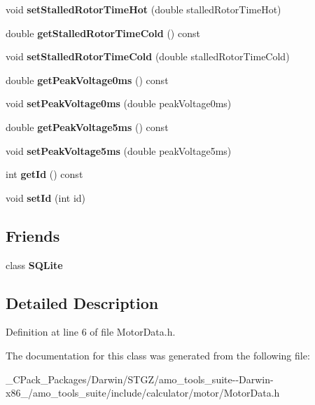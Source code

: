 \begin{DoxyCompactItemize}
void {\bfseries set\+Stalled\+Rotor\+Time\+Hot} (double stalled\+Rotor\+Time\+Hot)
\item 
\mbox{\label{class_motor_data_aa8ccd929fc9a25765440fb8b04e71a44}} 
double {\bfseries get\+Stalled\+Rotor\+Time\+Cold} () const
\item 
\mbox{\label{class_motor_data_ad52da7f0ac62233e71564023c22f6138}} 
void {\bfseries set\+Stalled\+Rotor\+Time\+Cold} (double stalled\+Rotor\+Time\+Cold)
\item 
\mbox{\label{class_motor_data_aef4147e64c402f7e89e295b050f302d3}} 
double {\bfseries get\+Peak\+Voltage0ms} () const
\item 
\mbox{\label{class_motor_data_ace2eb139ee2b7d070573ffd201853e41}} 
void {\bfseries set\+Peak\+Voltage0ms} (double peak\+Voltage0ms)
\item 
\mbox{\label{class_motor_data_a63cb35bd7064d68a989a84219b0f210a}} 
double {\bfseries get\+Peak\+Voltage5ms} () const
\item 
\mbox{\label{class_motor_data_a1556adb7bc4d3f92565e6fa3783e1d52}} 
void {\bfseries set\+Peak\+Voltage5ms} (double peak\+Voltage5ms)
\item 
\mbox{\label{class_motor_data_ac67a3f78e851968c9979e60cbf0f495b}} 
int {\bfseries get\+Id} () const
\item 
\mbox{\label{class_motor_data_ae26351f2cfd4e0acbd413b008ac2759f}} 
void {\bfseries set\+Id} (int id)
\end{DoxyCompactItemize}
\subsection*{Friends}
\begin{DoxyCompactItemize}
\item 
\mbox{\label{class_motor_data_a0102f3b3c0cbf96db6c49f071fa5e7cc}} 
class {\bfseries S\+Q\+Lite}
\end{DoxyCompactItemize}


\subsection{Detailed Description}


Definition at line 6 of file Motor\+Data.\+h.



The documentation for this class was generated from the following file\+:\begin{DoxyCompactItemize}
\item 
\+\_\+\+C\+Pack\+\_\+\+Packages/\+Darwin/\+S\+T\+G\+Z/amo\+\_\+tools\+\_\+suite-\/-\/\+Darwin-\/x86\+\_/amo\+\_\+tools\+\_\+suite/include/calculator/motor/Motor\+Data.\+h\end{DoxyCompactItemize}
